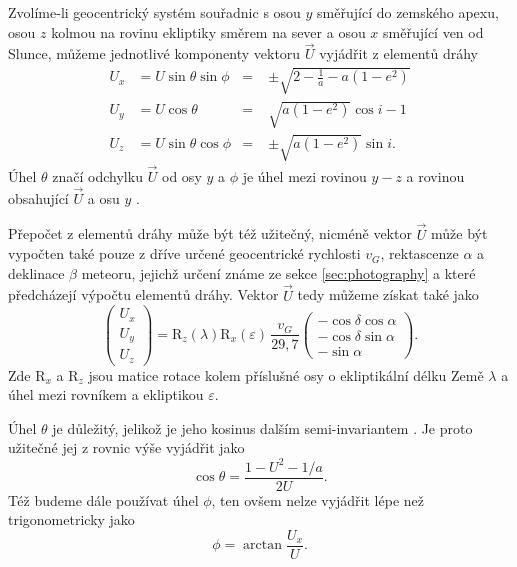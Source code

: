 Zvolíme-li geocentrický systém souřadnic s osou $y$ směřující do zemského apexu, osou $z$ kolmou na rovinu ekliptiky směrem na sever a osou $x$ směřující ven od Slunce, můžeme jednotlivé komponenty vektoru $\vec{U}$ vyjádřit z elementů dráhy \cite{newapproach}
\begin{equation}
    \begin{aligned}
        U_x & = U\sin{\theta}\sin{\phi} & =\; & \pm\sqrt{2-\frac{1}{a}-a(1-e^2)}  \\
        U_y & = U\cos{\theta}           & =\; & \sqrt{a(1-e^2)}\cos{i}-1          \\
        U_z & = U\sin{\theta}\cos{\phi} & =\; & \pm\sqrt{a(1-e^2)}\sin{i}\text{.}
    \end{aligned}
    \label{eqn:geocentric:u}
\end{equation}
Úhel $\theta$ značí odchylku $\vec{U}$ od osy $y$ a $\phi$ je úhel mezi rovinou $y\!-\!z$ a rovinou obsahující $\vec{U}$ a osu $y$ \cite{newapproach}.

Přepočet z elementů dráhy může být též užitečný, nicméně vektor $\vec{U}$ může být vypočten také pouze z dříve určené geocentrické rychlosti $v_G$, rektascenze $\alpha$ a deklinace $\beta$ meteoru, jejichž určení známe ze sekce \ref{sec:photography} a které předcházejí výpočtu elementů dráhy. Vektor $\vec{U}$ tedy můžeme získat také jako \cite{newapproach}
\begin{equation}
    \begin{pmatrix}
        U_x\\U_y\\U_z
    \end{pmatrix}=\text{R}_z(\lambda)\text{R}_x(\varepsilon)\,\frac{v_G}{29{,}7}\begin{pmatrix}
        -\cos{\delta}\cos{\alpha}\\
        -\cos{\delta}\sin{\alpha}\\
        -\sin{\alpha}
    \end{pmatrix}\text{.}
\end{equation}
Zde $\text{R}_x$ a $\text{R}_z$ jsou matice rotace kolem příslušné osy o ekliptikální délku Země $\lambda$ a úhel mezi rovníkem a ekliptikou $\varepsilon$.

\medskip

Úhel $\theta$ je důležitý, jelikož je jeho kosinus dalším semi-invariantem \cite{newapproach}. Je proto užitečné jej z rovnic výše vyjádřit jako \cite{newapproach}
\begin{equation}
    \cos{\theta}=\frac{1-U^2-1/a}{2U}\text{.}
\end{equation}
Též budeme dále používat úhel $\phi$, ten ovšem nelze vyjádřit lépe než trigonometricky jako \cite{newapproach}
\begin{equation}
    \phi=\arctan{\frac{U_x}{U}}\text{.}
\end{equation}

